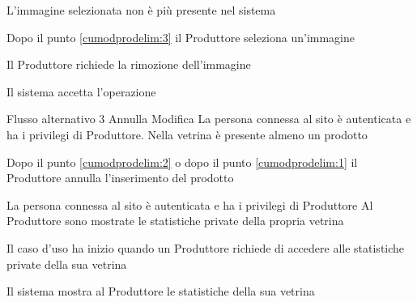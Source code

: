 {L'immagine selezionata non è più presente nel sistema}%
{\begin{enumCU}
		\item Dopo il punto \ref{cumodprodelim:3} il Produttore seleziona un'immagine
		\item Il Produttore richiede la rimozione dell'immagine
		\item Il sistema accetta l'operazione
	\end{enumCU}}%
%
{Flusso alternativo 3}%
{Annulla Modifica}%
{La persona connessa al sito è autenticata e ha i privilegi di Produttore. Nella vetrina è presente almeno un prodotto}%
{\postNulle}%
{\begin{enumCU}
		\item Dopo il punto \ref{cumodprodelim:2} o dopo il punto \ref{cumodprodelim:1} il Produttore annulla l'inserimento del prodotto
	\end{enumCU}}%

\tabcuvspace

{}
{La persona connessa al sito è autenticata e ha i privilegi di Produttore}
{Al Produttore sono mostrate le statistiche private della propria vetrina}
{\begin{enumCU}
		\item Il caso d'uso ha inizio quando un Produttore richiede di accedere alle statistiche private della sua vetrina
		\item Il sistema mostra al Produttore le statistiche della sua vetrina
	\end{enumCU}}


